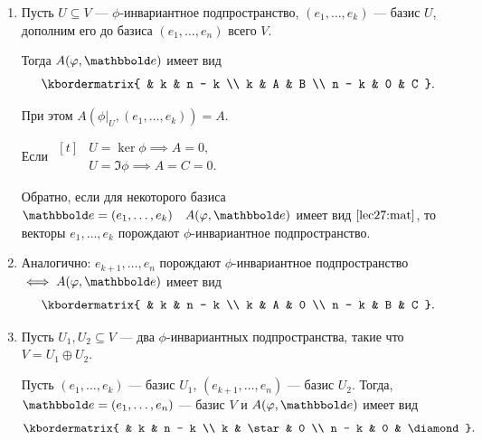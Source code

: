 \begin{enumerate}
    \item 
        Пусть $U \subseteq V$ --- $\phi$-инвариантное подпространство, $(e_1, \dots, e_k)$ --- базис $U$, дополним его до базиса $(e_1, \dots, e_n)$ всего $V$.
        
        Тогда $A(\phi, \E)$ имеет вид
        \begin{equation}
            \label{lec27:mat}
            \kbordermatrix{
                  & k & n - k \\
                k & A & B \\
                n - k & 0 & C
            }
        .\end{equation}

        При этом $A\left(\phi\big|_U, (e_1, \dots, e_k)\right) = A$.

        Если
        \begin{math}
            \begin{aligned}[t]
                &U = \ker \phi \implies A = 0, \\
                &U = \Im \phi \implies A = C = 0.
            \end{aligned}
        \end{math}

        Обратно, если для некоторого базиса $\E = (e_1, \dots, e_k) \quad A(\phi, \E)$ имеет вид $\eqref{lec27:mat}$, то векторы $e_1, \dots, e_k$ порождают $\phi$-инвариантное подпространство.

    \item
        Аналогично: $e_{k + 1}, \dots, e_n$ порождают $\phi$-инвариантное подпространство $\iff A(\phi, \E)$ имеет вид
        \begin{equation*}
            \kbordermatrix{
                  & k & n - k \\
                k & A & 0 \\
                n - k & B & C
            }
        .\end{equation*}

    \item 
        Пусть $U_1, U_2 \subseteq V$ --- два $\phi$-инвариантных подпространства, такие что $V = U_1 \oplus U_2$.
        
        Пусть $(e_1, \dots, e_k)$ --- базис $U_1$, $(e_{k + 1}, \dots, e_n)$ --- базис $U_2$.
        Тогда, $\E = (e_1, \dots, e_n)$ --- базис $V$ и $A(\phi, \E)$ имеет вид
        \begin{equation*}
            \kbordermatrix{
                      & k & n - k \\
                k     & \star & 0 \\
                n - k & 0 & \diamond
            }
        .\end{equation*}


\end{enumerate}

